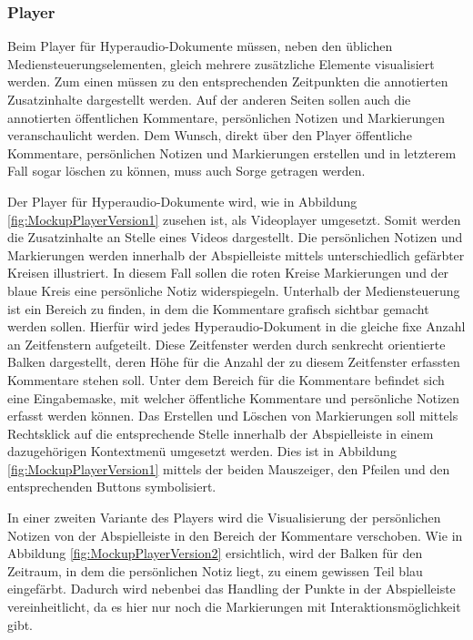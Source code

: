 \subsubsection{Player}
Beim Player für Hyperaudio-Dokumente müssen, neben den üblichen Mediensteuerungselementen, gleich mehrere zusätzliche Elemente visualisiert werden. Zum einen müssen zu den entsprechenden Zeitpunkten die annotierten Zusatzinhalte dargestellt werden. Auf der anderen Seiten sollen auch die annotierten öffentlichen Kommentare, persönlichen Notizen und Markierungen veranschaulicht werden. Dem Wunsch, direkt über den Player öffentliche Kommentare, persönlichen Notizen und Markierungen erstellen und in letzterem Fall sogar löschen zu können, muss auch Sorge getragen werden.

Der Player für Hyperaudio-Dokumente wird, wie in Abbildung \ref{fig:MockupPlayerVersion1} zusehen ist, als Videoplayer umgesetzt. Somit werden die Zusatzinhalte an Stelle eines Videos dargestellt. Die persönlichen Notizen und Markierungen werden innerhalb der Abspielleiste mittels unterschiedlich gefärbter Kreisen illustriert. In diesem Fall sollen die roten Kreise Markierungen und der blaue Kreis eine persönliche Notiz widerspiegeln. Unterhalb der Mediensteuerung ist ein Bereich zu finden, in dem die Kommentare grafisch sichtbar gemacht werden sollen. Hierfür wird jedes Hyperaudio-Dokument in die gleiche fixe Anzahl an Zeitfenstern aufgeteilt. Diese Zeitfenster werden durch senkrecht orientierte Balken dargestellt, deren Höhe für die Anzahl der zu diesem Zeitfenster erfassten Kommentare stehen soll. Unter dem Bereich für die Kommentare befindet sich eine Eingabemaske, mit welcher öffentliche Kommentare und persönliche Notizen erfasst werden können. Das Erstellen und Löschen von Markierungen soll mittels Rechtsklick auf die entsprechende Stelle innerhalb der Abspielleiste in einem dazugehörigen Kontextmenü umgesetzt werden. Dies ist in Abbildung \ref{fig:MockupPlayerVersion1} mittels der beiden Mauszeiger, den Pfeilen und den entsprechenden Buttons symbolisiert.



In einer zweiten Variante des Players wird die Visualisierung der persönlichen Notizen von der Abspielleiste in den Bereich der Kommentare verschoben. Wie in Abbildung \ref{fig:MockupPlayerVersion2} ersichtlich,  wird der Balken für den Zeitraum, in dem die persönlichen Notiz liegt, zu einem gewissen Teil blau eingefärbt. Dadurch wird nebenbei das Handling der Punkte in der Abspielleiste vereinheitlicht, da es hier nur noch die Markierungen mit Interaktionsmöglichkeit gibt.

